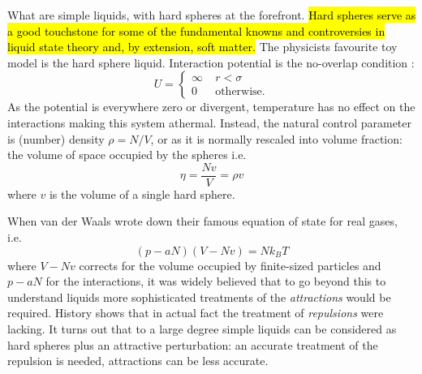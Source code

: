 \documentclass[11pt,twoside]{report}
\begin{document}
What are simple liquids, with hard spheres at the forefront.
\hl{Hard spheres serve as a good touchstone for some of the fundamental knowns and controversies in liquid state theory and, by extension, soft matter.}
The physicists favourite toy model is the hard sphere liquid.
Interaction potential is the no-overlap condition%
:
\begin{equation}
  U =
  \begin{cases}
    \infty & \; r < \sigma \\
    0 & \; \textrm{otherwise}.
  \end{cases}
\end{equation}
As the potential is everywhere zero or divergent, temperature has no effect on the interactions making this system athermal.
Instead, the natural control parameter is (number) density $\rho = N/V$, or as it is normally rescaled into volume fraction: the volume of space occupied by the spheres i.e.\
\begin{equation}
  \eta = \frac{N v}{V} = \rho v
\end{equation}
where $v$ is the volume of a single hard sphere.

When van der Waals wrote down their famous equation of state for real gases, i.e.\
\begin{equation}
  (p - a N)(V - Nv) = N k_B T
\end{equation}
where $V - Nv$ corrects for the volume occupied by finite-sized particles and $p - aN$ for the interactions,
it was widely believed that to go beyond this to understand liquids more sophisticated treatments of the \emph{attractions} would be required.
History shows that in actual fact the treatment of \emph{repulsions} were lacking.
It turns out that to a large degree simple liquids can be considered as hard spheres plus an attractive perturbation: an accurate treatment of the repulsion is needed, attractions can be less accurate.
\end{document}
